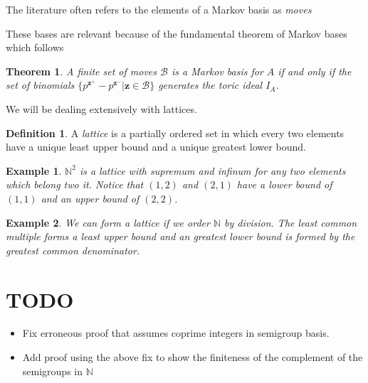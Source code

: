 \documentclass[11pt]{amsart}
\theoremstyle{plain}
\newtheorem{thm}{Theorem}
\newtheorem{exa}{Example}
\theoremstyle{definition}
\newtheorem{defi}{Definition}
\begin{document}
The literature often refers to the elements of a Markov basis as \emph{moves}\cite[p.16]{bernd}

These bases are relevant because of the fundamental theorem of Markov bases which follows
\begin{thm}
\cite[p.~54]{aoki}
A finite set of moves $\mathcal{B}$ is a Markov basis for $A$ if and only if the set of binomials $\{p^{\mathbf{z}^+}-p^{\mathbf{z}^-}|\mathbf{z}\in \mathcal{B}\}$ generates the toric ideal $I_A$.
\end{thm}

We will be dealing extensively with lattices.
\begin{defi}
\cite{stanley}
A \emph{lattice} is a partially ordered set in which every two elements have a unique least upper bound and a unique greatest lower bound.
\end{defi}
\begin{exa}
$\mathbb{N}^2$ is a lattice with supremum and infinum for any two elements which belong two it. Notice that $(1,2)$ and $(2,1)$ have a lower bound of $(1,1)$ and an upper bound of $(2,2)$.
\end{exa}
\begin{exa}
We can form a lattice if we order $\mathbb{N}$ by division. The least common multiple forms a least upper bound and an greatest lower bound is formed by the greatest common denominator.
\end{exa}
\section*{TODO}
\begin{itemize}
\item
Fix erroneous proof that assumes coprime integers in semigroup basis.
\item

Add proof using the above fix to show the finiteness of the complement of the semigroups in $\mathbb{N}$
\end{itemize}



\end{document}

